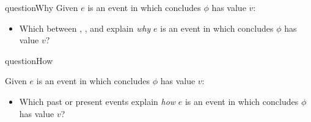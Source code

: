 \begin{note}
\begin{question}{questionWhy}{\qWhy{}}
    Given \(e\) is an event in which \vAgent{} concludes \(\phi\) has value \(v\):
    \begin{itemize}
    \item
      Which \ros{} between , , and  explain \emph{why} \(e\) is an event in which \vAgent{} concludes \(\phi\) has value \(v\)?
    \end{itemize}
    \vspace{-\baselineskip}
  \end{question}

  \begin{question}{questionHow}{\qHow{}}
    \label{q:how}
    \medskip

    Given \(e\) is an event in which \vAgent{} concludes \(\phi\) has value \(v\):
    \begin{itemize}
    \item
      Which past or present events explain \emph{how} \(e\) is an event in which \vAgent{} concludes \(\phi\) has value \(v\)?
    \end{itemize}
    \vspace{-\baselineskip}
  \end{question}
\end{note}

